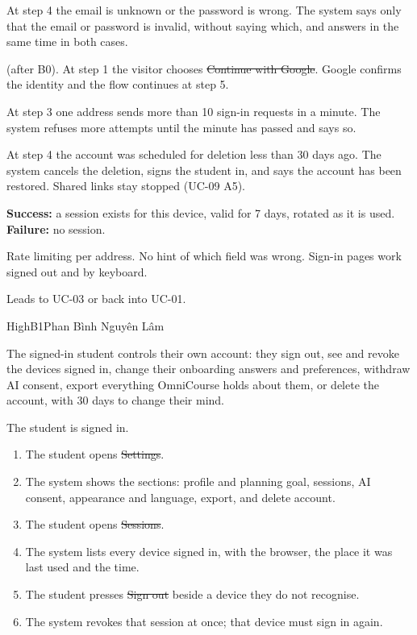 \begin{altflows}
  \item[A1. Wrong email or password.] At step 4 the email is unknown or the password is wrong. The system says only that
        the email or password is invalid, without saying which, and answers in the same time in both cases.
  \item[A2. Sign in with Google] (after B0). At step 1 the visitor chooses \st{Continue with Google}. Google confirms the
        identity and the flow continues at step 5.
  \item[A3. Too many attempts.] At step 3 one address sends more than 10 sign-in requests in a minute. The system refuses
        more attempts until the minute has passed and says so.
  \item[A4. Account scheduled for deletion.] At step 4 the account was scheduled for deletion less than 30 days ago. The
        system cancels the deletion, signs the student in, and says the account has been restored. Shared links stay
        stopped (UC-09 A5).
\end{altflows}

\textbf{Success:} a session exists for this device, valid for 7 days, rotated as it is used. \textbf{Failure:} no
session.

Rate limiting per address. No hint of which field was wrong. Sign-in pages work signed out and by keyboard.

Leads to UC-03 or back into UC-01.

%
{High}{B1}{Phan Bình Nguyên Lâm}

The signed-in student controls their own account: they sign out, see and revoke the devices signed in, change their
onboarding answers and preferences, withdraw AI consent, export everything OmniCourse holds about them, or delete the
account, with 30 days to change their mind.

The student is signed in.

\begin{enumerate}
  \item The student opens \st{Settings}.
  \item The system shows the sections: profile and planning goal, sessions, AI consent, appearance and language, export,
        and delete account.
  \item The student opens \st{Sessions}.
  \item The system lists every device signed in, with the browser, the place it was last used and the time.
  \item The student presses \st{Sign out} beside a device they do not recognise.
  \item The system revokes that session at once; that device must sign in again.
\end{enumerate}

